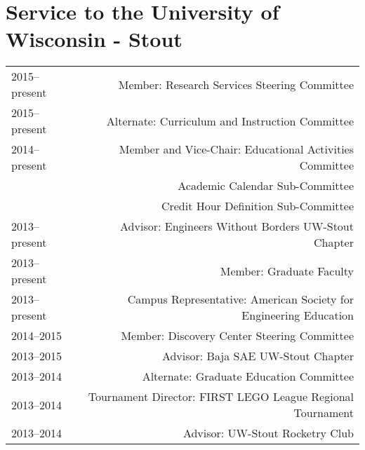 \section*{Service to the University of Wisconsin - Stout}
\begin{tabular}{L!{\VRule}R}
2015--present&Member: Research Services Steering Committee \\
2015--present&Alternate: Curriculum and Instruction Committee \\
2014--present&Member and Vice-Chair: Educational Activities Committee \\
 &Academic Calendar Sub-Committee \\
 &Credit Hour Definition Sub-Committee \\
2013--present&Advisor: Engineers Without Borders UW-Stout Chapter \\
2013--present&Member: Graduate Faculty \\
2013--present&Campus Representative: American Society for Engineering Education\\
2014--2015&Member: Discovery Center Steering Committee \\
2013--2015&Advisor: Baja SAE UW-Stout Chapter \\
2013--2014&Alternate: Graduate Education Committee \\
2013--2014&Tournament Director: FIRST LEGO League Regional Tournament\\
2013--2014&Advisor: UW-Stout Rocketry Club\\
\end{tabular}